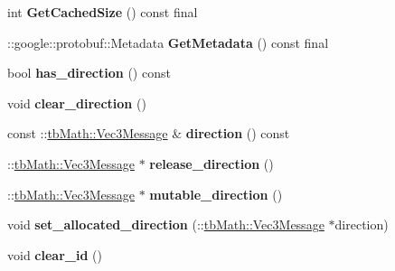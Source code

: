 \begin{DoxyCompactItemize}
int {\bfseries Get\+Cached\+Size} () const final
\item 
\mbox{\label{classtbBasics_1_1ApplyPhysicsBody_a2d844208c01cb19710e0226d0ef976a1}} 
\+::google\+::protobuf\+::\+Metadata {\bfseries Get\+Metadata} () const final
\item 
\mbox{\label{classtbBasics_1_1ApplyPhysicsBody_a1a2f2dc3459a646cfb0b2ac9e08d12e8}} 
bool {\bfseries has\+\_\+direction} () const
\item 
\mbox{\label{classtbBasics_1_1ApplyPhysicsBody_a9a8a63176c8be83bf9a5754ffb4c842f}} 
void {\bfseries clear\+\_\+direction} ()
\item 
\mbox{\label{classtbBasics_1_1ApplyPhysicsBody_a36e6926c8012d4de6907728b8d406ccb}} 
const \+::\hyperlink{classtbMath_1_1Vec3Message}{tb\+Math\+::\+Vec3\+Message} \& {\bfseries direction} () const
\item 
\mbox{\label{classtbBasics_1_1ApplyPhysicsBody_a75e4c5908badb5cb659d190b9b8971bc}} 
\+::\hyperlink{classtbMath_1_1Vec3Message}{tb\+Math\+::\+Vec3\+Message} $\ast$ {\bfseries release\+\_\+direction} ()
\item 
\mbox{\label{classtbBasics_1_1ApplyPhysicsBody_aed5a00b3af4172f15c728c2c6d9be782}} 
\+::\hyperlink{classtbMath_1_1Vec3Message}{tb\+Math\+::\+Vec3\+Message} $\ast$ {\bfseries mutable\+\_\+direction} ()
\item 
\mbox{\label{classtbBasics_1_1ApplyPhysicsBody_a6556de2b398a9764f92543a2afbce199}} 
void {\bfseries set\+\_\+allocated\+\_\+direction} (\+::\hyperlink{classtbMath_1_1Vec3Message}{tb\+Math\+::\+Vec3\+Message} $\ast$direction)
\item 
\mbox{\label{classtbBasics_1_1ApplyPhysicsBody_ac373c7ab9ab74b78c6b9f484f6e4281d}} 
void {\bfseries clear\+\_\+id} ()
\item 
\mbox{\label{classtbBasics_1_1ApplyPhysicsBody_ad1c65cd8d6f7b8b2506c6c3b69030316}} 

\end{DoxyCompactItemize}
